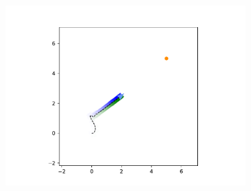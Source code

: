 \documentclass[main.tex]{subfiles}
\begin{document}
\begin{figure}[h]
\begin{subfigure}{0.20\textwidth}
        \includegraphics[width=\textwidth]{figures/Simulations/sim1/frame_4.pdf}
    \end{subfigure}
    

\end{figure}
\end{document}
